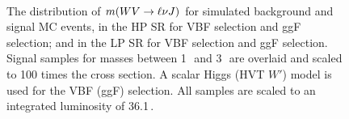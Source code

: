 \begin{figure}[tbp]
\centering
{}
\\
\caption[Invariant mass distribution of signal and background samples in the signal regions]{The distribution of $m(WV\rightarrow\ell\nu J)$ for simulated background and signal MC events, in the HP SR for \protect{} VBF selection and \protect{} ggF selection; and in the LP SR for \protect{} VBF selection and \protect{} ggF selection. Signal samples for masses between 1\,\TeV\, and 3\,\TeV\, are overlaid and scaled to 100 times the cross section. A scalar Higgs (HVT $W'$) model is used for the VBF (ggF) selection. All samples are scaled to an integrated luminosity of 36.1\,\ifb.}
\label{fig:sig_mvv}
\end{figure}

